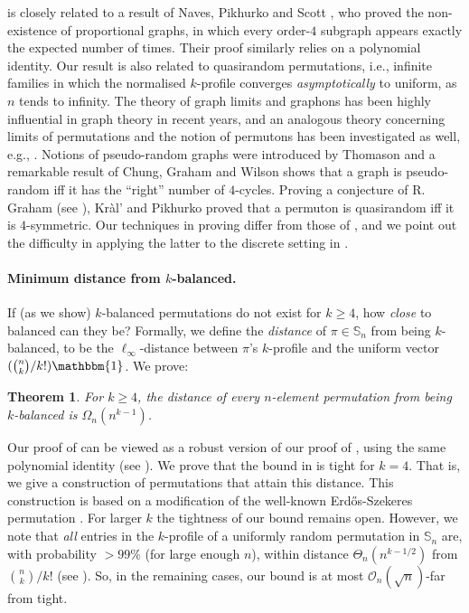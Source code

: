 \documentclass{article}
\newcommand{\Sn}{\mathbb{S}_n}
\newcommand{\ESZ}{Erd\H{o}s-Szekeres\xspace}
\theoremstyle{remark}
\theoremstyle{plain}
\newtheorem{thm}{Theorem}
\begin{document}
 is closely related to a result of
Naves, Pikhurko and Scott \cite{naves2018unproportional}, who proved the non-existence of proportional graphs,
in which every order-$4$ subgraph appears exactly the expected number of times. 
Their proof similarly relies on a 
polynomial identity. Our result is also related to quasirandom permutations,
i.e.,  infinite families in which the normalised $k$-profile converges \textit{asymptotically} to uniform, as $n$ tends to infinity.
The theory of graph limits and graphons \cite{lovasz2012large} has been highly influential 
in graph theory in recent years, and an analogous theory concerning limits of
permutations and the notion of permutons has been investigated as well,
e.g., \cite{cooper2004quasirandom,hoppen2013limits, hoppen2011limits}.
Notions of pseudo-random graphs were introduced by Thomason \cite{thomason1987pseudo}
and a remarkable result of Chung, Graham and Wilson \cite{chung1989quasi} shows that a graph
is pseudo-random iff it has the ``right'' number of $4$-cycles. Proving
a conjecture of R. Graham (see \cite{cooper2004quasirandom}), Kr\`al' and Pikhurko \cite{kral2013quasirandom}
proved that a permuton is quasirandom iff it is $4$-symmetric. Our techniques in
proving  differ from those of \cite{kral2013quasirandom}, 
and we point out the difficulty in applying the latter to 
the discrete setting in .

\paragraph{Minimum distance from $k$-balanced.}
If (as we show)
$k$-balanced permutations do not exist for $k \ge 4$, 
how \textit{close} to balanced can they be?
Formally, we define the \textit{distance} of $\pi \in \Sn$ from being $k$-balanced,
to be the $\ell_\infty$-distance between $\pi$'s $k$-profile and the uniform vector $(\binom{n}{k}/k!)\mathbbm{1}$.
We prove:

\begin{thm}
    \label{thm_lb_distance}
    For $k\geq 4$, the distance of every $n$-element permutation from being $k$-balanced is $\Omega_n(n^{k-1})$.
\end{thm}

Our proof of  can be viewed as a robust version of
our proof of , using the same
polynomial identity (see ).  
We prove that the bound in  is tight for $k = 4$.
That is, we give a construction of permutations that attain this distance.
This construction is based on a modification of the well-known \ESZ permutation
\cite{erdos1935combinatorial}.
For larger $k$ the tightness of our bound remains open.
However, we note that \textit{all} entries
in the $k$-profile of a uniformly random permutation in $\mathbb{S}_n$ 
are, with probability $>99\%$ (for large enough $n$), within distance
$\Theta_n(n^{k - 1/2})$ from $\binom{n}{k}/k!$ (see ).
So, in the remaining cases, our bound is at most $\mathcal{O}_n\left(\sqrt{n}\right)$-far from tight. 
\end{document}
